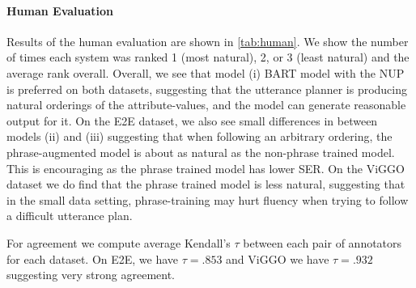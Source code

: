 

\paragraph{Human Evaluation} Results of the human evaluation are shown in
\autoref{tab:human}. We show the number of times each system was ranked 1
(most natural), 2, or 3 (least natural) and the average rank overall.
Overall, we see that model (i) BART  model with the NUP  is
preferred on both datasets, suggesting that the utterance planner is
producing natural orderings of the attribute-values, and the model can
generate reasonable output for it. On the E2E dataset, we also see small
differences in between models (ii)  and (iii) 
suggesting that when following an arbitrary ordering, the phrase-augmented
model is about as natural as the non-phrase trained model. This is encouraging
as the phrase trained model has lower SER. On the ViGGO dataset we do find
that the phrase trained model is less natural, suggesting that in the small
data setting, phrase-training may hurt fluency when trying to follow a
difficult utterance plan.

For agreement we compute average Kendall's $\tau$ between each pair of
annotators for each dataset. On E2E, we have $\tau=.853$ and ViGGO we have
$\tau=.932$ suggesting very strong agreement.
